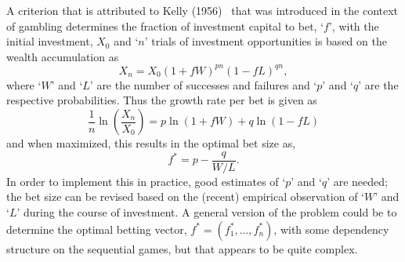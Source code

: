 A criterion that is attributed to Kelly (1956)~\cite{kelly56} that was introduced in the context of gambling determines the fraction of investment capital to bet, `$f$', with the initial investment, $X_0$ and `$n$' trials of investment opportunities is based on the wealth accumulation as
	\begin{equation} \label{eqn:xmx01f}
	X_n= X_0(1+fW)^{pn} (1-fL)^{qn},
	\end{equation}
where `$W$' and `$L$' are the number of successes and failures and `$p$' and `$q$' are the respective probabilities. Thus the growth rate per bet is given as
	\begin{equation} \label{eqn:1nln}
	\dfrac{1}{n} \ln \left(\dfrac{X_n}{X_0}\right)= p \ln(1+fW) + q \ln(1-fL)
	\end{equation}
and when maximized, this results in the optimal bet size as,
	\begin{equation} \label{eqn:fstarp}
	f^*= p - \dfrac{q}{W/L}.
	\end{equation}
In order to implement this in practice, good estimates of `$p$' and `$q$' are needed; the bet size can be revised based on the (recent) empirical observation of `$W$' and `$L$' during the course of investment. A general version of the problem could be to determine the optimal betting vector, $f^*=(f_1^*, \ldots, f_n^*)$, with some dependency structure on the sequential games, but that appears to be quite complex. 


